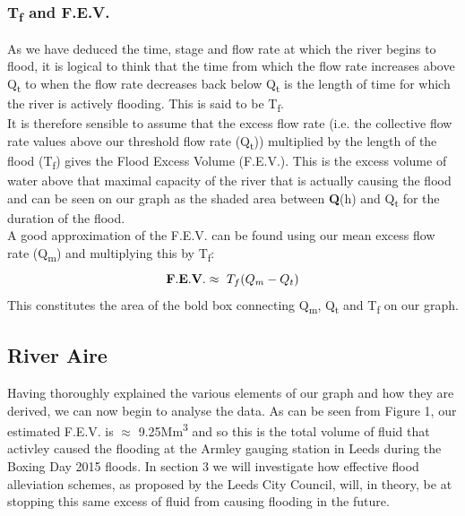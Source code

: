 \documentclass[11 pt, a4paper]{article}
\begin{document}
\subsubsection{T\textsubscript{f} and F.E.V.}
As we have deduced the time, stage and flow rate at which the river begins to flood, it is logical to think that the time from which the flow rate increases above Q\textsubscript{t} to when the flow rate decreases back below Q\textsubscript{t} is the length of time for which the river is actively flooding. This is said to be T\textsubscript{f}.\\ 
It is therefore sensible to assume that the excess flow rate (i.e. the collective flow rate values above our threshold flow rate (Q\textsubscript{t})) multiplied by the length of the flood (T\textsubscript{f}) gives the Flood Excess Volume (F.E.V.). This is the excess volume of water above that maximal capacity of the river that is actually causing the flood and can be seen on our graph as the shaded area between {\bf Q}(h) and Q\textsubscript{t} for the duration of the flood.\\
A good approximation of the F.E.V. can be found using our mean excess flow rate (Q\textsubscript{m}) and multiplying this by T\textsubscript{f}:
\[{\bf F.E.V.}\approx\ T_f (Q_m - Q_t)\]
This constitutes the area of the bold box connecting Q\textsubscript{m}, Q\textsubscript{t} and T\textsubscript{f} on our graph.

\subsection{River Aire}
Having thoroughly explained the various elements of our graph and how they are derived, we can now begin to analyse the data. As can be seen from Figure 1, our estimated F.E.V. is $\approx$ 9.25Mm\textsuperscript{3} and so this is the total volume of fluid that activley caused the flooding at the Armley gauging station in Leeds during the Boxing Day 2015 floods. In section 3 we will investigate how effective flood alleviation schemes, as proposed by the Leeds City Council, will, in theory, be at stopping this same excess of fluid from causing flooding in the future.
\end{document}
